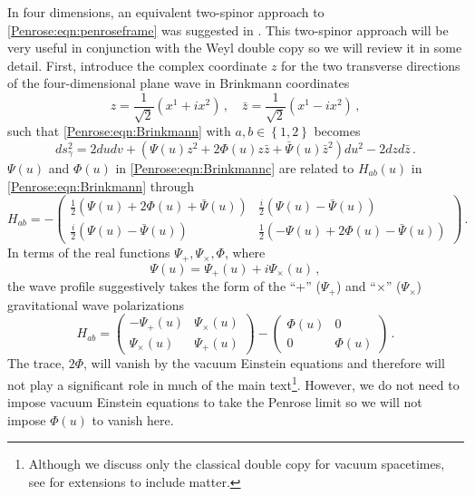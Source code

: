 In four dimensions, an equivalent two-spinor approach to \eqref{Penrose:eqn:penroseframe} was suggested in \cite{Tod:2019urw}. This two-spinor approach will be very useful in conjunction with the Weyl double copy so we will review it in some detail. First, introduce the complex coordinate $z$ for the two transverse directions of the four-dimensional plane wave in Brinkmann coordinates
\begin{equation}\label{Penrose:eqn:complexz}
z = \frac{1}{\sqrt{2}}\left(x^1 + i x^2\right) \, , \quad \bar{z} = \frac{1}{\sqrt{2}}\left(x^1 - i x^2\right)  \, ,
\end{equation}
such that \eqref{Penrose:eqn:Brinkmann} with $a,b \in \left\lbrace  1,2\right \rbrace$ becomes
\begin{equation}\label{Penrose:eqn:Brinkmannc}
ds_{\gamma}^2 = 2 du dv + \left(\Psi(u) z^2 + 2 \Phi(u) z \bar{z} + \bar{\Psi}(u) \bar{z}^2\right) du^2 - 2 dz d\bar{z}  \, .
\end{equation}
$\Psi(u)$ and $\Phi(u)$ in \eqref{Penrose:eqn:Brinkmannc} are related to $H_{ab}(u)$ in \eqref{Penrose:eqn:Brinkmann} through
\begin{equation}\label{Penrose:eqn:HBrinkmannincomplex}
H_{ab} = - \begin{pmatrix}
\frac{1}{2}\left(\Psi(u)+ 2 \Phi(u)  + \bar{\Psi}(u)\right) & 	\frac{i}{2}\left(\Psi(u) - \bar{\Psi}(u)\right)\\
\frac{i}{2}\left(\Psi(u) - \bar{\Psi}(u)\right) 	&  \frac{1}{2}\left(-\Psi(u)+ 2 \Phi(u)  - \bar{\Psi}(u)\right) 
\end{pmatrix}  \, .
\end{equation}
In terms of the real functions $\Psi_{+},\Psi_{\times},\Phi$, where
\begin{equation}
\Psi(u) = \Psi_{+}(u) + i \Psi_{\times}(u) \, ,
\end{equation}
the wave profile suggestively takes the form of the ``+'' ($\Psi_{+}$) and ``$\times$'' ($\Psi_{\times}$) gravitational wave polarizations
\begin{equation}
H_{ab} =  \begin{pmatrix}
- \Psi_{+}(u) & 	\Psi_{\times}(u) \\
\Psi_{\times}(u) 	&   \Psi_{+}(u) 
\end{pmatrix} - \begin{pmatrix}
\Phi(u)  & 	0 \\
0 	&   \Phi(u) 
\end{pmatrix} \, .
\end{equation}
The trace, $2\Phi$, will vanish by the vacuum Einstein equations and therefore will not play a significant role in much of the main text\footnote{Although we discuss only the classical double copy for vacuum spacetimes, see \cite{Easson:2021asd,Easson:2022zoh} for extensions to include matter.}. However, we do not need to impose vacuum Einstein equations to take the Penrose limit so we will not impose $\Phi(u)$ to vanish here.

